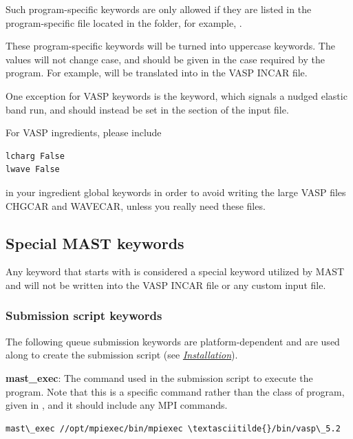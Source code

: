 \documentclass[letterpaper,10pt,english]{sphinxmanual}
\begin{document}
Such program-specific keywords are only allowed if they are listed in the program-specific file located in the  folder, for example, .

These program-specific keywords will be turned into uppercase keywords. The values will not change case, and should be given in the case required by the program. For example,  will be translated into  in the VASP INCAR file.

One exception for VASP keywords is the  keyword, which signals a nudged elastic band run, and should instead be set in the  section of the input file.

For VASP ingredients, please include

\begin{Verbatim}[commandchars=\\\{\}]
lcharg False
lwave False
\end{Verbatim}

in your ingredient global keywords in order to avoid writing the large VASP files CHGCAR and WAVECAR, unless you really need these files.


\subsection{Special MAST keywords}
\label{3_1_2_ingredients:special-mast-keywords}
Any keyword that starts with  is considered a special keyword utilized by MAST and will not be written into the VASP INCAR file or any custom input file.


\subsubsection{Submission script keywords}
\label{3_1_2_ingredients:submission-script-keywords}
The following queue submission keywords are platform-dependent and are used along to create the submission script (see {\hyperref[1_0_installation::doc]{\emph{Installation}}}).

\textbf{mast\_exec}: The command used in the submission script to execute the program. Note that this is a specific command rather than the class of program, given in , and it should include any MPI commands.

\begin{Verbatim}[commandchars=\\\{\}]
mast\_exec //opt/mpiexec/bin/mpiexec \textasciitilde{}/bin/vasp\_5.2
\end{Verbatim}
\end{document}
